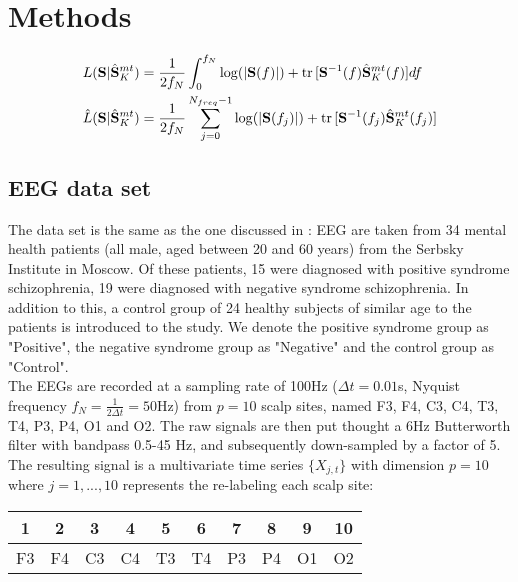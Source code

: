 \documentclass[9pt,journal]{IEEEtran}
\numberwithin{equation}{section}
\newcommand\tr{\normalfont \text{tr}\,}
\newcommand\fnyq{f_N}
\begin{document}
\section{Methods}
\label{sec:methods}
\begin{figure*}[!b]
\hrulefill
\vspace*{2pt}
\setcounter{section}{2}
\setcounter{equation}{5}
\begin{align}
L(\bold S | \hat{\bold S}^{mt}_K) &= \frac{1}{2\fnyq} \int^{\fnyq}_0 \log(|\bold S(f)|)+\tr[\bold S^{-1}(f)\hat{\bold S}^{mt}_K(f)] df\label{eq:gammaXvalid}\\
\hat{L}(\bold S | \hat{\bold S}^{mt}_K) &= \frac{1}{2\fnyq} \sum^{N_{freq}-1}_{j=0} \log(|\bold S(f_j)|)+\tr[\bold S^{-1}(f_j)\hat{\bold S}^{mt}_K(f_j)] \label{eq:gammaXapprox}
\end{align}
\setcounter{section}{2}
\setcounter{equation}{0}
\end{figure*}
\subsection*{EEG data set}
The data set is the same as the one discussed in \cite{Medkour2010}: EEG are taken from 34 mental health patients (all male, aged between 20 and 60 years) from the Serbsky Institute in Moscow.  Of these patients, 15 were diagnosed with positive syndrome schizophrenia, 19 were diagnosed with negative syndrome schizophrenia. In addition to this, a control group of 24 healthy subjects of similar age to the patients is introduced to the study. We denote the positive syndrome group as "Positive", the negative syndrome group as "Negative" and the control group as "Control".\\
The EEGs are recorded at a sampling rate of 100Hz ($\Delta t = 0.01$s, Nyquist frequency $f_N = \frac{1}{2\Delta t} = 50$Hz) from $p=10$ scalp sites, named F3, F4, C3, C4, T3, T4, P3, P4, O1 and O2. The raw signals are then put thought a 6Hz Butterworth filter with bandpass 0.5-45 Hz, and subsequently down-sampled by a factor of 5. The resulting signal  is a multivariate time series $\{ X_{j,t}\}$ with dimension $p=10$ where
 $j=1,...,10$ represents the re-labeling each scalp site:
\begin{table}[H]
\centering
\begin{tabular}{cccccccccc}
\hline
1&2&3&4&5&6&7&8&9&10\\
\hline
 F3& F4&C3& C4&T3 &T4& P3&P4& O1&O2\\
\hline
\end{tabular}
\end{table}
\end{document}
